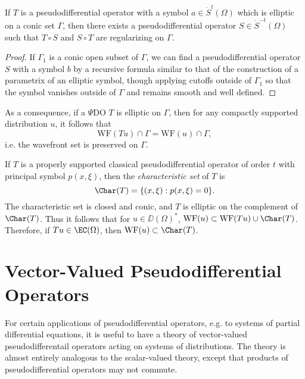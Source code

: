\begin{theorem}
    If $T$ is a pseudodifferential operator with a symbol $a \in \dot{S}^t(\Omega)$ which is elliptic on a conic set $\Gamma$, then there exists a pseudodifferential operator $S \in \dot{S}^{-t}(\Omega)$ such that $T \circ S$ and $S \circ T$ are regularizing on $\Gamma$.
\end{theorem}
\begin{proof}
    If $\Gamma_1$ is a conic open subset of $\Gamma$, we can find a pseudodifferential operator $S$ with a symbol $b$ by a recursive formula similar to that of the construction of a parametrix of an elliptic symbol, though applying cutoffs outside of $\Gamma_1$ so that the symbol vanishes outside of $\Gamma$ and remains smooth and well defined.
\end{proof}

As a consequence, if a $\Psi$DO $T$ is elliptic on $\Gamma$, then for any compactly supported distribution $u$, it follows that
%
\[ \text{WF}(Tu) \cap \Gamma = \text{WF}(u) \cap \Gamma, \]
%
i.e. the wavefront set is preserved on $\Gamma$.

If $T$ is a properly supported classical pseudodifferential operator of order $t$ with principal symbol $p(x,\xi)$, then the \emph{characteristic set} of $T$ is
%
\[ \Char(T) = \{ (x,\xi): p(x,\xi) = 0 \}. \]
%
The characteristic set is closed and conic, and $T$ is elliptic on the complement of $\Char(T)$. Thus it follows that for $u \in \DD(\Omega)^*$, $\text{WF}(u) \subset \text{WF}(Tu) \cup \Char(T)$. Therefore, if $Tu \in \EC(\Omega)$, then $\text{WF}(u) \subset \Char(T)$.





\section{Vector-Valued Pseudodifferential Operators}

For certain applications of pseudodifferential operators, e.g. to systems of partial differential equations, it is useful to have a theory of vector-valued pseudodifferentail operators acting on systems of distributions. The theory is almost entirely analogous to the scalar-valued theory, except that products of pseudodifferential operators may not commute.

